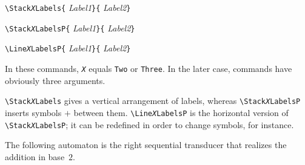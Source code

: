\documentclass[11pt,twoside]{article}
\newlength{\ColoText}%
\newlength{\ColoFigu}%
\newlength{\parindenttemp} %
\newcommand{\noi}{\noindent}
\newlength{\jsIndent}%
\begin{document}
\noi 
\hspace*{-\jsIndent}
\begin{minipage}[t]{\ColoText}
        \par\vspace*{0mm}%
        \footnotesize
\verb+\Stack+\texttt{\textsl{X}}\verb+Labels{+%
   \textsl{Label1}\verb+}{+%
   \textsl{Label2}\verb+}+

\medskip
\verb+\Stack+\texttt{\textsl{X}}\verb+LabelsP{+%
   \textsl{Label1}\verb+}{+%
   \textsl{Label2}\verb+}+

\medskip
\verb+\Line+\texttt{\textsl{X}}\verb+LabelsP{+%
   \textsl{Label1}\verb+}{+%
   \textsl{Label2}\verb+}+

\end{minipage}%
\hspace*{1.2em}%
\begin{minipage}[t]{\ColoFigu}%
\par\vspace*{0mm}%
In these commands, \texttt{\textsl{X}} equals \texttt{Two} or \texttt{Three}.
In the later case, commands have obviously three arguments.

\verb+\Stack+\texttt{\textsl{X}}\verb+Labels+ gives a vertical arrangement of labels, whereas
\verb+\Stack+\texttt{\textsl{X}}\verb+LabelsP+ inserts symbols $+$ between them.
\verb+\Line+\texttt{\textsl{X}}\verb+LabelsP+ is the horizontal version of \verb+\Stack+\texttt{\textsl{X}}\verb+LabelsP+;
it can be redefined in order to change symbols, for instance.
\end{minipage}%

\noi
The following automaton is the right sequential transducer that realizes the addition in base~$2$.
\end{document}
